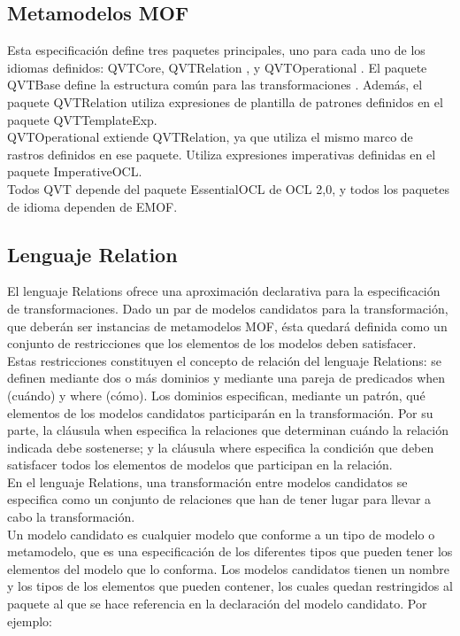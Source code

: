 {\subsection{Metamodelos MOF}
\label{Metamodelos MOF}

Esta especificación define tres paquetes principales, uno para cada uno de los idiomas definidos: QVTCore, QVTRelation , y QVTOperational . El paquete QVTBase define la estructura común para las transformaciones . Además, el paquete QVTRelation utiliza expresiones de plantilla de patrones definidos en el paquete QVTTemplateExp.\\
QVTOperational extiende QVTRelation, ya que utiliza el mismo marco de rastros definidos en ese paquete. Utiliza expresiones imperativas definidas en el paquete ImperativeOCL.\\
Todos QVT depende del paquete EssentialOCL de OCL 2,0, y todos los paquetes de idioma dependen de EMOF.

\subsection{Lenguaje Relation}
\label{Lenguaje Relation}


El lenguaje Relations ofrece una aproximación declarativa para la especificación de transformaciones. Dado un par de modelos candidatos para la transformación, que deberán ser instancias de metamodelos MOF, ésta quedará definida como un conjunto de restricciones que los elementos de los modelos deben satisfacer.\\
Estas restricciones constituyen el concepto de relación del lenguaje Relations: se definen mediante dos o más dominios y mediante una pareja de predicados when (cuándo) y where (cómo). Los dominios especifican, mediante un patrón, qué elementos de los modelos candidatos participarán en la transformación. Por su parte, la cláusula when especifica la relaciones que determinan cuándo la relación indicada debe sostenerse; y la cláusula where especifica la condición que deben satisfacer todos los elementos de modelos que participan en la relación.\\

En el lenguaje Relations, una transformación entre modelos candidatos se especifica como un conjunto de relaciones que han de tener lugar para llevar a cabo la transformación.\\
Un modelo candidato es cualquier modelo que conforme a un tipo de modelo o metamodelo, que es una especificación de los diferentes tipos que pueden tener los elementos del modelo que lo conforma. Los modelos candidatos tienen un nombre y los tipos de los elementos que pueden contener, los cuales quedan restringidos al paquete al que se hace referencia en la declaración del modelo candidato. Por ejemplo:\\

}
